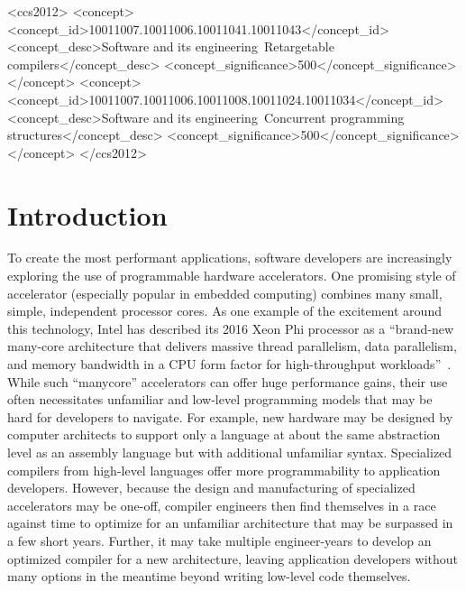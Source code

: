 \documentclass{sig-alternate-05-2015}
\begin{document}
%
%
\begin{CCSXML}
<ccs2012>
<concept>
<concept_id>10011007.10011006.10011041.10011043</concept_id>
<concept_desc>Software and its engineering~Retargetable compilers</concept_desc>
<concept_significance>500</concept_significance>
</concept>
<concept>
<concept_id>10011007.10011006.10011008.10011024.10011034</concept_id>
<concept_desc>Software and its engineering~Concurrent programming structures</concept_desc>
<concept_significance>500</concept_significance>
</concept>
</ccs2012>
\end{CCSXML}

%
%

%
%
\printccsdesc


\section{Introduction}
To create the most performant applications, software developers are increasingly exploring the use of programmable hardware accelerators. One promising style of accelerator (especially popular in embedded computing) combines many small, simple, independent processor cores. As one example of the excitement around this technology, Intel has described its 2016 Xeon Phi processor as a ``brand-new many-core architecture that delivers massive thread parallelism, data parallelism, and memory bandwidth in a CPU form factor for high-throughput workloads''~\cite{xeonphi}. While such ``manycore'' accelerators can offer huge performance gains, their use often necessitates unfamiliar and low-level programming models that may be hard for developers to navigate. For example, new hardware may be designed by computer architects to support only a language at about the same abstraction level as an assembly language but with additional unfamiliar syntax. Specialized compilers from high-level languages offer more programmability to application developers. However, because the design and manufacturing of specialized accelerators may be one-off, compiler engineers then find themselves in a race against time to optimize for an unfamiliar architecture that may be surpassed in a few short years. Further, it may take multiple engineer-years to develop an optimized compiler for a new architecture, leaving application developers without many options in the meantime beyond writing low-level code themselves.
\end{document}

